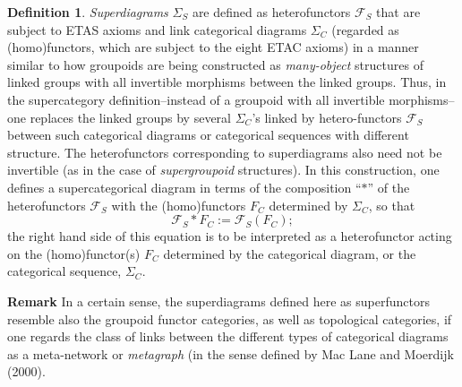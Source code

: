 \documentclass[12pt]{article}
\theoremstyle{plain}
\theoremstyle{definition}
\newtheorem{definition}{Definition}[section]
\theoremstyle{plain}
\numberwithin{equation}{section}
\newcommand{\F}{\mathcal F}
\begin{document}
\begin{definition}
\emph{Superdiagrams} $\Sigma_S$ are defined as heterofunctors $\F_S$ that are subject to ETAS axioms and link categorical diagrams $\Sigma_C$ (regarded as (homo)functors, which are subject to the eight ETAC axioms) in a manner similar to how groupoids are being constructed as \emph{many-object} structures of linked groups with all invertible morphisms between the linked groups. Thus, in the supercategory definition--instead of a groupoid with all invertible morphisms-- one replaces the linked groups by several $\Sigma_C$'s linked by hetero-functors $\F_S$ between such categorical diagrams or categorical sequences with different structure. The heterofunctors corresponding to 
superdiagrams also need not be invertible (as in the case of \emph{supergroupoid} structures). In this construction, one defines a supercategorical diagram in terms of the composition ``$*$'' of the heterofunctors $\F_S$ with the (homo)functors $F_C$ determined by $\Sigma_C$, so that $$\F_S * F_C := \F_S (F_C);$$ 
the right hand side of this equation is to be interpreted as a heterofunctor acting on the (homo)functor(s) $F_C$ determined by the categorical diagram, or the categorical sequence, $\Sigma_C$.
\end{definition}

\textbf{Remark}
In a certain sense, the superdiagrams defined here as superfunctors resemble also the groupoid functor categories, as well as topological categories, if one regards the class of links between the different types of categorical diagrams as a meta-network or \emph{metagraph} (in the sense defined by Mac Lane and Moerdijk (2000). 


\end{document}
